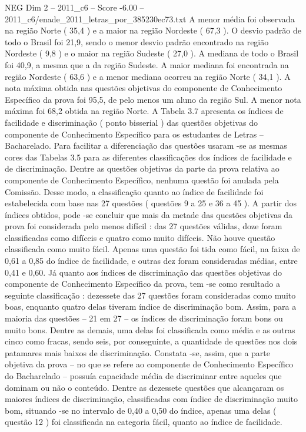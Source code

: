 \begin{textsample}{NEG Dim 2 – 2011\_c6 – Score -6.00 – 2011\_c6/enade\_2011\_letras\_por\_385230ec73.txt}
A menor média foi observada na região Norte ( 35,4 ) e a maior na região Nordeste ( 67,3 ).
O desvio padrão de todo o Brasil foi 21,9, sendo o menor desvio padrão encontrado na região Nordeste ( 9,8 ) e o maior na região Sudeste ( 27,0 ).
A mediana de todo o Brasil foi 40,9, a mesma que a da região Sudeste.
A maior mediana foi encontrada na região Nordeste ( 63,6 ) e a menor mediana ocorreu na região Norte ( 34,1 ).
A nota máxima obtida nas questões objetivas do componente de Conhecimento Específico da prova foi 95,5, de pelo menos um aluno da região Sul.
A menor nota máxima foi 68,2 obtida na região Norte.
A Tabela 3.7 apresenta os índices de facilidade e discriminação ( ponto bisserial ) das questões objetivas do componente de Conhecimento Específico para os estudantes de Letras – Bacharelado.
Para facilitar a diferenciação das questões usaram -se as mesmas cores das Tabelas 3.5 para as diferentes classificações dos índices de facilidade e de discriminação.
Dentre as questões objetivas da parte da prova relativa ao componente de Conhecimento Específico, nenhuma questão foi anulada pela Comissão.
Desse modo, a classificação quanto ao índice de facilidade foi estabelecida com base nas 27 questões ( questões 9 a 25 e 36 a 45 ).
A partir dos índices obtidos, pode -se concluir que mais da metade das questões objetivas da prova foi considerada pelo menos difícil : das 27 questões válidas, doze foram classificadas como difíceis e quatro como muito difíceis.
Não houve questão classificada como muito fácil.
Apenas uma questão foi tida como fácil, na faixa de 0,61 a 0,85 do índice de facilidade, e outras dez foram consideradas médias, entre 0,41 e 0,60.
Já quanto aos índices de discriminação das questões objetivas do componente de Conhecimento Específico da prova, tem -se como resultado a seguinte classificação : dezessete das 27 questões foram consideradas como muito boas, enquanto quatro delas tiveram índice de discriminação bom.
Assim, para a maioria das questões – 21 em 27 – os índices de discriminação foram bons ou muito bons.
Dentre as demais, uma delas foi classificada como média e as outras cinco como fracas, sendo seis, por conseguinte, a quantidade de questões nos dois patamares mais baixos de discriminação.
Constata -se, assim, que a parte objetiva da prova – no que se refere ao componente de Conhecimento Específico do Bacharelado – possuía capacidade média de discriminar entre aqueles que dominam ou não o conteúdo.
Dentre as dezessete questões que alcançaram os maiores índices de discriminação, classificadas com índice de discriminação muito bom, situando -se no intervalo de 0,40 a 0,50 do índice, apenas uma delas ( questão 12 ) foi classificada na categoria fácil, quanto ao índice de facilidade.

\end{textsample}
